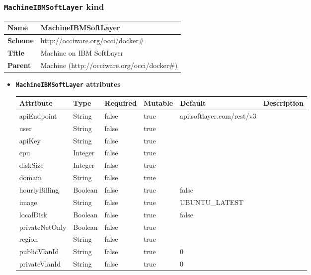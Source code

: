 \subsubsection{\texttt{MachineIBMSoftLayer} kind}
\begin{center}
\begin{tabular}{|l|l|}
  \hline
  \textbf{Name} & MachineIBMSoftLayer \\
  \hline  
  \textbf{Scheme} & http://occiware.org/occi/docker\# \\
  \hline
  \textbf{Title} & Machine on IBM SoftLayer \\
  \hline
  \textbf{Parent} & Machine (http://occiware.org/occi/docker\#) \\
  \hline
\end{tabular}
\end{center}
\begin{itemize}
\item \textbf{\texttt{MachineIBMSoftLayer} attributes}

\begin{tabularx}{\textwidth}{|l|l|p{1.4cm}|p{1.3cm}|l|X|}
  \hline
  \textbf{Attribute} & \textbf{Type} & \textbf{Required} & \textbf{Mutable} & \textbf{Default} & \textbf{Description} \\
  \hline  
  apiEndpoint & String & false & true & api.softlayer.com/rest/v3 &  \\
  \hline
  user & String & false & true &  &  \\
  \hline
  apiKey & String & false & true &  &  \\
  \hline
  cpu & Integer & false & true &  &  \\
  \hline
  diskSize & Integer & false & true &  &  \\
  \hline
  domain & String & false & true &  &  \\
  \hline
  hourlyBilling & Boolean & false & true & false &  \\
  \hline
  image & String & false & true & UBUNTU\_LATEST &  \\
  \hline
  localDisk & Boolean & false & true & false &  \\
  \hline
  privateNetOnly & Boolean & false & true &  &  \\
  \hline
  region & String & false & true &  &  \\
  \hline
  publicVlanId & String & false & true & 0 &  \\
  \hline
  privateVlanId & String & false & true & 0 &  \\
  \hline
\end{tabularx}
\end{itemize}



